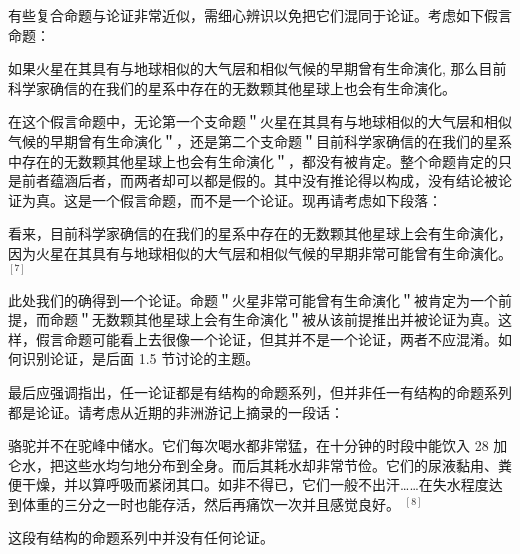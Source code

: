 有些复合命题与论证非常近似，需细心辨识以免把它们混同于论证。考虑如下假言命题：

\begin{displayquote}
如果火星在其具有与地球相似的大气层和相似气候的早期曾有生命演化, 那么目前科学家确信的在我们的星系中存在的无数颗其他星球上也会有生命演化。
\end{displayquote}

在这个假言命题中，无论第一个支命题＂火星在其具有与地球相似的大气层和相似气候的早期曾有生命演化＂，还是第二个支命题＂目前科学家确信的在我们的星系中存在的无数颗其他星球上也会有生命演化＂，都没有被肯定。整个命题肯定的只是前者蕴涵后者，而两者却可以都是假的。其中没有推论得以构成，没有结论被论证为真。这是一个假言命题，而不是一个论证。现再请考虑如下段落：

看来，目前科学家确信的在我们的星系中存在的无数颗其他星球上会有生命演化，因为火星在其具有与地球相似的大气层和相似气候的早期非常可能曾有生命演化。 ${}^{[7]}$

此处我们的确得到一个论证。命题＂火星非常可能曾有生命演化＂被肯定为一个前提，而命题＂无数颗其他星球上会有生命演化＂被从该前提推出并被论证为真。这样，假言命题可能看上去很像一个论证，但其并不是一个论证，两者不应混淆。如何识别论证，是后面 1.5 节讨论的主题。

最后应强调指出，任一论证都是有结构的命题系列，但并非任一有结构的命题系列都是论证。请考虑从近期的非洲游记上摘录的一段话：

\begin{displayquote}
骆驼并不在驼峰中储水。它们每次喝水都非常猛，在十分钟的时段中能饮入 28 加仑水，把这些水均匀地分布到全身。而后其耗水却非常节俭。它们的尿液黏甪、粪便干燥，并以算呼吸而紧闭其口。如非不得已，它们一般不出汗……在失水程度达到体重的三分之一时也能存活，然后再痛饮一次并且感觉良好。 ${ }^{[8]}$
\end{displayquote}

这段有结构的命题系列中并没有任何论证。 